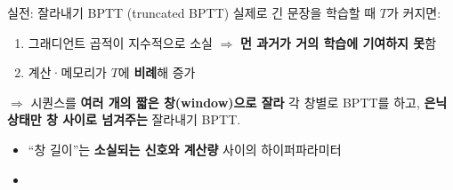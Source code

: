 \begin{frame}{실전: 잘라내기 BPTT (truncated BPTT)}
  실제로 긴 문장을 학습할 때 $T$가 커지면:
  \begin{enumerate}
    \item 그래디언트 곱적이 지수적으로 소실 $\Rightarrow$
      \textbf{먼 과거가 거의 학습에 기여하지 못}함
    \item 계산·메모리가 $T$에 \textbf{비례}해 증가
  \end{enumerate}
  $\Rightarrow$ 시퀀스를 \textbf{여러 개의 짧은 창(window)으로
  잘라} 각 창별로 BPTT를 하고, \textbf{은닉 상태만 창 사이로
  넘겨주는} 잘라내기 BPTT.
  \begin{itemize}
    \item ``창 길이''는 \textbf{소실되는 신호와 계산량} 사이의
      하이퍼파라미터
    \item {}
  \end{itemize}
\end{frame}
